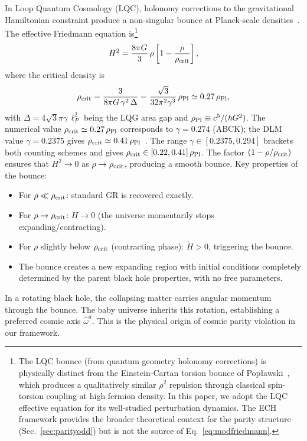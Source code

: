 \documentclass[aps,prd,twocolumn,superscriptaddress,showpacs,preprintnumbers,nofootinbib,longbibliography,floatfix]{revtex4-2}
\newcommand{\rhocrit}{\rho_{\rm crit}}
\newcommand{\rhoPl}{\rho_{\rm Pl}}
\begin{document}
In Loop Quantum Cosmology (LQC), holonomy corrections to the gravitational Hamiltonian constraint produce a non-singular bounce at Planck-scale densities~\cite{Ashtekar2011}. The effective Friedmann equation is\footnote{The LQC bounce (from quantum geometry holonomy corrections) is physically distinct from the Einstein-Cartan torsion bounce of Pop\l{}awski~\cite{Poplawski2012}, which produces a qualitatively similar $\rho^2$ repulsion through classical spin-torsion coupling at high fermion density. In this paper, we adopt the LQC effective equation for its well-studied perturbation dynamics. The ECH framework provides the broader theoretical context for the parity structure (Sec.~\ref{sec:parityodd}) but is not the source of Eq.~\eqref{eq:modfriedmann}.}
\begin{equation}\label{eq:modfriedmann}
H^2 = \frac{8\pi G}{3}\,\rho\left[1-\frac{\rho}{\rhocrit}\right],
\end{equation}
where the critical density is
\begin{equation}\label{eq:rhocrit}
\rhocrit = \frac{3}{8\pi G\,\gamma^2\,\Delta} = \frac{\sqrt{3}}{32\pi^2\gamma^3}\,\rhoPl \simeq 0.27\,\rhoPl,
\end{equation}
with $\Delta = 4\sqrt{3}\pi\gamma\,\ell_P^2$ being the LQG area gap and $\rhoPl\equiv c^5/(\hbar G^2)$. The numerical value $\rhocrit \simeq 0.27\,\rhoPl$ corresponds to $\gamma = 0.274$ (ABCK); the DLM value $\gamma = 0.2375$ gives $\rhocrit \simeq 0.41\,\rhoPl$~\cite{Ashtekar2011}. The range $\gamma \in [0.2375, 0.294]$ brackets both counting schemes and gives $\rhocrit \in [0.22, 0.41]\,\rhoPl$. The factor $(1-\rho/\rhocrit)$ ensures that $H^2 \to 0$ as $\rho \to \rhocrit$, producing a smooth bounce. Key properties of the bounce:

\begin{itemize}[leftmargin=*]
\item For $\rho \ll \rhocrit$: standard GR is recovered exactly.
\item For $\rho \to \rhocrit$: $H \to 0$ (the universe momentarily stops expanding/contracting).
\item For $\rho$ slightly below $\rhocrit$ (contracting phase): $\dot{H} > 0$, triggering the bounce.
\item The bounce creates a new expanding region with initial conditions completely determined by the parent black hole properties, with no free parameters.
\end{itemize}

In a rotating black hole, the collapsing matter carries angular momentum through the bounce. The baby universe inherits this rotation, establishing a preferred cosmic axis $\hat{\omega}^a$. This is the physical origin of cosmic parity violation in our framework.
\end{document}
